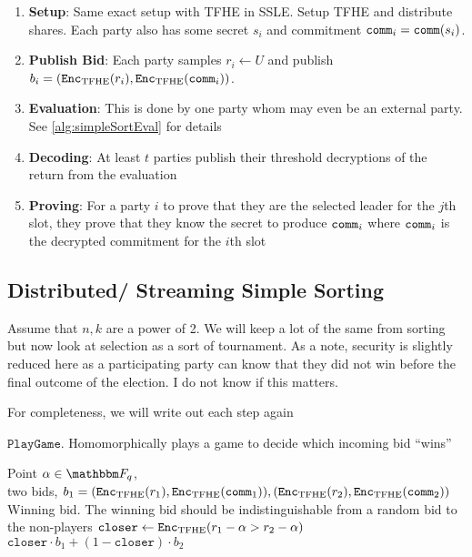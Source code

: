 \documentclass[11pt]{article}
\begin{document}
\begin{enumerate}
	\item \textbf{Setup}: Same exact setup with TFHE in SSLE. Setup TFHE and distribute shares.
	      Each party also has some secret $s_i$ and commitment $\texttt{comm}_i = \texttt{comm}(s_i)$.
	\item \textbf{Publish Bid}: Each party samples $r_i \leftarrow U$ and publish $b_i = (\texttt{Enc}_{\mathrm{TFHE}}(r_i), \texttt{Enc}_{\mathrm{TFHE}}(\texttt{comm}_i))$.
	\item \textbf{Evaluation}: This is done by one party whom may even be an external party. See \cref{alg:simpleSortEval} for details
	\item \textbf{Decoding}: At least $t$ parties publish their threshold decryptions of the return from the evaluation
	\item \textbf{Proving}: For a party $i$ to prove that they are the selected leader for the $j$th slot, they prove that they know the secret to produce $\texttt{comm}_i$
	      where $\texttt{comm}_i$ is the decrypted commitment for the $i$th slot
\end{enumerate}

\subsection{Distributed/ Streaming Simple Sorting}
Assume that $n, k$ are a power of 2. We will keep a lot of the same from sorting
but now look at selection as a sort of tournament. As a note, security is slightly reduced here as
a participating party can know that they did not win before the final outcome of the election. I do not know if this matters.

For completeness, we will write out each step again

\algrenewcommand{}
\algrenewcommand{}

\begin{algorithm}
	\caption{$\texttt{PlayGame}$. Homomorphically plays a game to decide which incoming bid ``wins''}
	\label{alg:playGame}
	\begin{algorithmic}
		\Require Point $\alpha \in \F_q$, \\two bids, $b_1 = (\texttt{Enc}_{\mathrm{TFHE}}(r_1), \texttt{Enc}_{\mathrm{TFHE}}(\texttt{comm}_1)), (\texttt{Enc}_{\mathrm{TFHE}}(r_2), \texttt{Enc}_{\mathrm{TFHE}}(\texttt{comm}_2))$
		\Ensure Winning bid. The winning bid should be indistinguishable from a random bid to the non-players
    \State $\texttt{closer} \gets \texttt{Enc}_{\mathrm{TFHE}}(r_1 - \alpha > r_2 - \alpha)$
    \State \Return $\texttt{closer} \cdot b_1 + (1 - \texttt{closer}) \cdot b_2$
	\end{algorithmic}
\end{algorithm}
\end{document}

